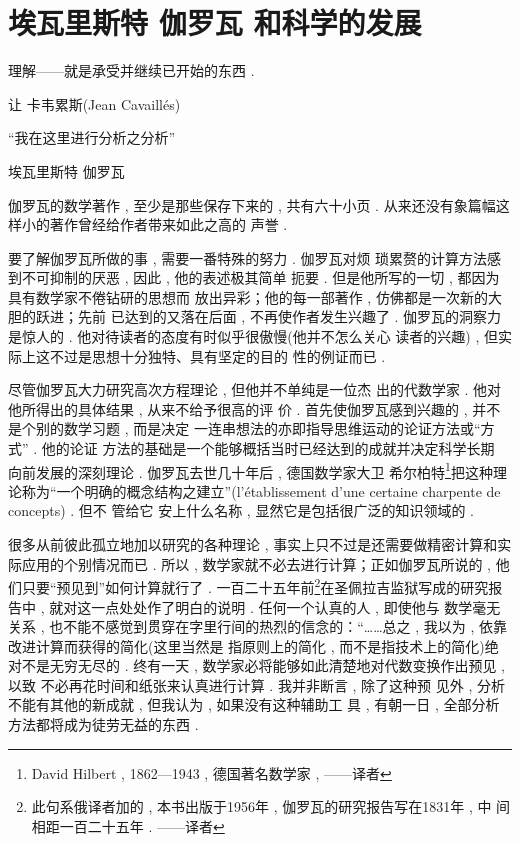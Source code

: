 \chapter{埃瓦里斯特 \textbullet 伽罗瓦 和科学的发展}


\begin{flushright}
	理解——就是承受并继续已开始的东西 .
	
	让 \textbullet 卡韦累斯(Jean Cavaillés)
	
	“我在这里进行分析之分析”
	
	埃瓦里斯特 \textbullet 伽罗瓦
\end{flushright}


伽罗瓦的数学著作 , 至少是那些保存下来的 , 共有六十小页 .  从来还没有象篇幅这样小的著作曾经给作者带来如此之高的 声誉 . 

要了解伽罗瓦所做的事 , 需要一番特殊的努力 . 伽罗瓦对烦 琐累赘的计算方法感到不可抑制的厌恶 , 因此 , 他的表述极其简单 扼要 . 但是他所写的一切 , 都因为具有数学家不倦钻研的思想而 放出异彩；他的每一部著作 , 仿佛都是一次新的大胆的跃进；先前 已达到的又落在后面 , 不再使作者发生兴趣了 . 伽罗瓦的洞察力 是惊人的 . 他对待读者的态度有时似乎很傲慢(他并不怎么关心 读者的兴趣) , 但实际上这不过是思想十分独特、具有坚定的目的 性的例证而已 . 

尽管伽罗瓦大力研究高次方程理论 , 但他并不单纯是一位杰 出的代数学家 . 他对他所得出的具体结果 , 从来不给予很高的评 价 . 首先使伽罗瓦感到兴趣的 , 并不是个别的数学习题 , 而是决定 一连串想法的亦即指导思维运动的论证方法或“方式” . 他的论证 方法的基础是一个能够概括当时已经达到的成就并决定科学长期 向前发展的深刻理论 . 伽罗瓦去世几十年后 , 德国数学家大卫 \textbullet 希尔柏特\footnote{David Hilbert , 1862—1943 , 德国著名数学家 , ——译者}把这种理论称为“一个明确的概念结构之建立”(l'établissement d'une certaine charpente de concepts) . 但不 管给它 安上什么名称 , 显然它是包括很广泛的知识领域的 . 

很多从前彼此孤立地加以研究的各种理论 , 事实上只不过是还需要做精密计算和实际应用的个别情况而已 . 所以 , 数学家就不必去进行计算；正如伽罗瓦所说的 , 他们只要“预见到”如何计算就行了 . 一百二十五年前\footnote{此句系俄译者加的 , 本书出版于1956年 , 伽罗瓦的研究报告写在1831年 , 中 间相距一百二十五年 . ——译者}在圣佩拉吉监狱写成的研究报告中 ,  就对这一点处处作了明白的说明 . 任何一个认真的人 , 即使他与 数学毫无关系 , 也不能不感觉到贯穿在字里行间的热烈的信念的：“……总之 , 我以为 , 依靠改进计算而获得的简化(这里当然是 指原则上的简化 , 而不是指技术上的简化)绝对不是无穷无尽的 .  终有一天 , 数学家必将能够如此清楚地对代数变换作出预见 , 以致 不必再花时间和纸张来认真进行计算 . 我并非断言 , 除了这种预 见外 , 分析不能有其他的新成就 , 但我认为 , 如果没有这种辅助工 具 , 有朝一日 , 全部分析方法都将成为徒劳无益的东西 . 

